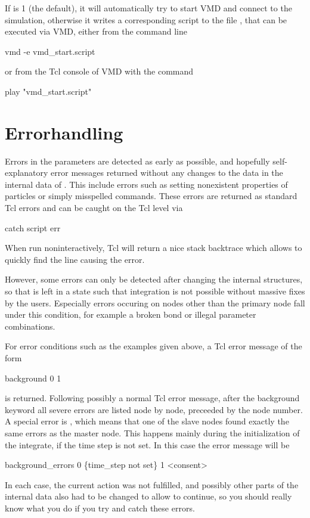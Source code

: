 If  is 1 (the default), it will automatically try to start
VMD and connect to the \es simulation, otherwise it writes a
corresponding script to the file , that can be
executed via VMD, either from the command line
\begin{code}
  vmd -e vmd_start.script
\end{code}
or from the Tcl console of VMD with the command
\begin{code}
  play "vmd\_start.script"
\end{code}


\section{Errorhandling}
Errors in the parameters are detected as early as possible, and
hopefully self-explanatory error messages returned without any changes
to the data in the internal data of \es. This include errors such as
setting nonexistent properties of particles or simply misspelled
commands. These errors are returned as standard Tcl errors and can be
caught on the Tcl level via
\begin{tclcode}
catch {script} err 
\end{tclcode}
When run noninteractively, Tcl will return a nice stack backtrace
which allows to quickly find the line causing the error.

However, some errors can only be detected after changing the internal
structures, so that \es is left in a state such that integration is
not possible without massive fixes by the users. Especially errors
occuring on nodes other than the primary node fall under this
condition, for example a broken bond or illegal parameter
combinations.

For error conditions such as the examples given above, a Tcl error
message of the form
\begin{code}
 background 0   1 
\end{code}
is returned. Following possibly a normal Tcl error message, after the
background keyword all severe errors are listed node by node,
preceeded by the node number. A special error is ,
which means that one of the slave nodes found exactly the same errors
as the master node. This happens mainly during the initialization of
the integrate, \eg if the time step is not set. In this case the error
message will be
\begin{code}
background\_errors 0 \{time\_step not set\} 1 <consent> 
\end{code}
In each case, the current action was not fulfilled, and possibly other
parts of the internal data also had to be changed to allow \es to
continue, so you should really know what you do if you try and catch
these errors.


